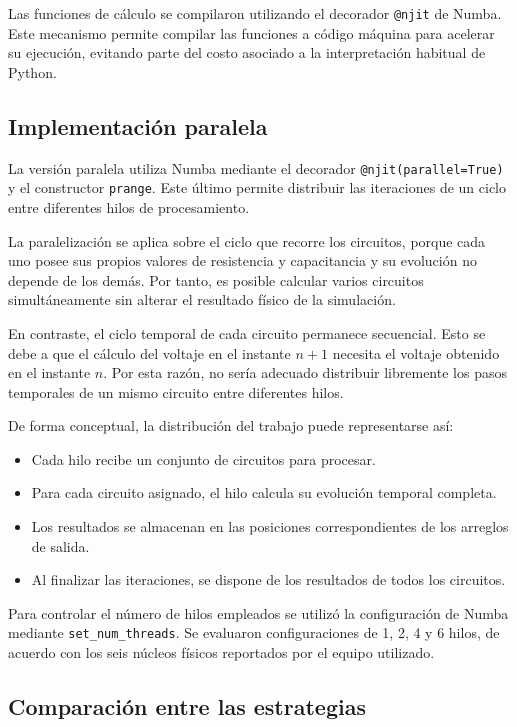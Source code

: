 \documentclass[11pt,a4paper]{article}
\begin{document}
Las funciones de cálculo se compilaron utilizando el decorador \texttt{@njit} de Numba. Este mecanismo permite compilar las funciones a código máquina para acelerar su ejecución, evitando parte del costo asociado a la interpretación habitual de Python.

\subsection{Implementación paralela}

La versión paralela utiliza Numba mediante el decorador \texttt{@njit(parallel=True)} y el constructor \texttt{prange}. Este último permite distribuir las iteraciones de un ciclo entre diferentes hilos de procesamiento.

La paralelización se aplica sobre el ciclo que recorre los circuitos, porque cada uno posee sus propios valores de resistencia y capacitancia y su evolución no depende de los demás. Por tanto, es posible calcular varios circuitos simultáneamente sin alterar el resultado físico de la simulación.

En contraste, el ciclo temporal de cada circuito permanece secuencial. Esto se debe a que el cálculo del voltaje en el instante $n+1$ necesita el voltaje obtenido en el instante $n$. Por esta razón, no sería adecuado distribuir libremente los pasos temporales de un mismo circuito entre diferentes hilos.

De forma conceptual, la distribución del trabajo puede representarse así:

\begin{itemize}[leftmargin=*]
    \item Cada hilo recibe un conjunto de circuitos para procesar.
    \item Para cada circuito asignado, el hilo calcula su evolución temporal completa.
    \item Los resultados se almacenan en las posiciones correspondientes de los arreglos de salida.
    \item Al finalizar las iteraciones, se dispone de los resultados de todos los circuitos.
\end{itemize}

Para controlar el número de hilos empleados se utilizó la configuración de Numba mediante \texttt{set\_num\_threads}. Se evaluaron configuraciones de 1, 2, 4 y 6 hilos, de acuerdo con los seis núcleos físicos reportados por el equipo utilizado.

\subsection{Comparación entre las estrategias}
\end{document}
